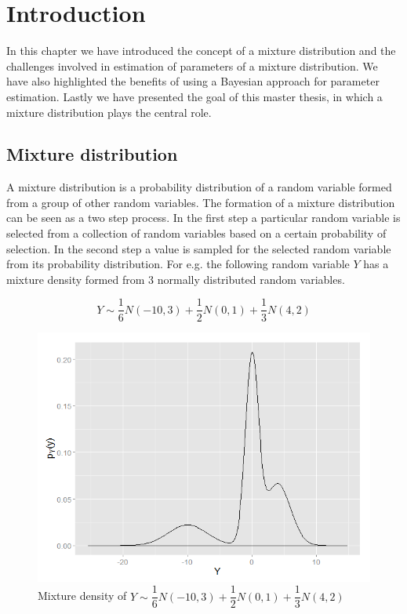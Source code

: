 
\chapter{Introduction}
\label{ch : introduction}

In this chapter we have introduced the concept of a mixture distribution and the challenges involved in estimation of parameters of a mixture distribution. We have also highlighted the benefits of using a Bayesian approach for parameter estimation. Lastly we have presented the goal of this master thesis, in which a mixture distribution plays the central role.

\section{Mixture distribution}
\label{sec : mixture_distribution}
A mixture distribution is a probability distribution of a random variable formed from a group of other random variables. The formation of a mixture distribution can be seen as a two step process. In the first step a particular random variable is selected from a collection of random variables based on a certain probability of selection. In the second step a value is sampled for the selected random variable from its probability distribution. For e.g. the following random variable $Y$ has a mixture density formed from 3 normally distributed random variables.

$$Y \sim \dfrac{1}{6}N(-10,3) + \dfrac{1}{2}N(0,1) + \dfrac{1}{3}N(4,2)$$

\begin{figure}
	\centering
	\includegraphics[scale=0.5]{mainmatter/chapter_1_introduction/mixture_density.png}
	\caption{Mixture density of $Y \sim \dfrac{1}{6}N(-10,3) + \dfrac{1}{2}N(0,1) + \dfrac{1}{3}N(4,2)$}
	\label{fig : mixture_density_1}
\end{figure}

